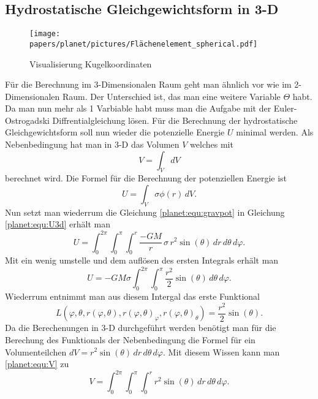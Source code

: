 \subsection{Hydrostatische Gleichgewichtsform in 3-D}
\begin{figure}
	\centering
	\texttt{[image: papers/planet/pictures/Flächenelement\_spherical.pdf]}
	\caption{Visualisierung Kugelkoordinaten}
\end{figure}
Für die Berechnung im 3-Dimensionalen Raum geht man ähnlich vor wie im 2-Dimensionalen Raum.
Der Unterschied ist, das man eine weitere Variable \(\Theta\) habt.
Da man nun mehr als 1 Varbiable habt muss man die Aufgabe mit der Euler-Ostrogadski Diffrentialgleichung lösen.
Für die Berechnung der hydrostatische Gleichgewichtsform soll nun wieder die potenzielle Energie \(U\) minimal werden.
Als Nebenbedingung hat man in 3-D das Volumen \(V\) welches mit 
\begin{equation}
	V = \int_{V}^{} dV
	\label{planet:equ:V}
\end{equation}
berechnet wird.
Die Formel für die Berechnung der potenziellen Energie ist
\begin{equation}
	U = \int_{V} \sigma  \phi (r)\, dV.
	\label{planet:equ:U3d}
\end{equation}
Nun setzt man wiederrum die Gleichung \ref{planet:equ:gravpot} in Gleichung \ref{planet:equ:U3d} erhält man
\begin{equation*}
	U = \int_{0}^{2\pi}\int_{0}^{\pi}\int_{0}^{r} \frac{-GM}{r}\, \sigma\, r^2 \sin (\theta) \, dr \, d\theta \, d\varphi.
\end{equation*}
Mit ein wenig umstelle und dem auflösen des ersten Integrals erhält man
\begin{equation*}
	U =-GM\sigma \int_{0}^{2\pi}\int_{0}^{\pi}\frac{r^2}{2}  \sin (\theta) \, d\theta \, d\varphi.
\end{equation*}
Wiederrum entnimmt man aus diesem Intergal das erste Funktional
\begin{equation*}
	L(\varphi,\theta ,r(\varphi,\theta),r(\varphi,\theta)_\varphi,r(\varphi,\theta)_\theta) = \frac{r^2}{2}  \sin (\theta).
\end{equation*}
Da die Berechenungen in 3-D durchgeführt werden benötigt man für die Berechung des Funktionals der Nebenbedingung die Formel für ein Volumenteilchen \(dV = r^2 \sin (\theta) \, dr \, d\theta \, d\varphi \).
Mit diesem Wissen kann man \ref{planet:equ:V} zu
\begin{equation*}
	V = \int_{0}^{2\pi}\int_{0}^{\pi}\int_{0}^{r} r^2 \sin (\theta) \, dr \, d\theta \, d\varphi.
\end{equation*}
